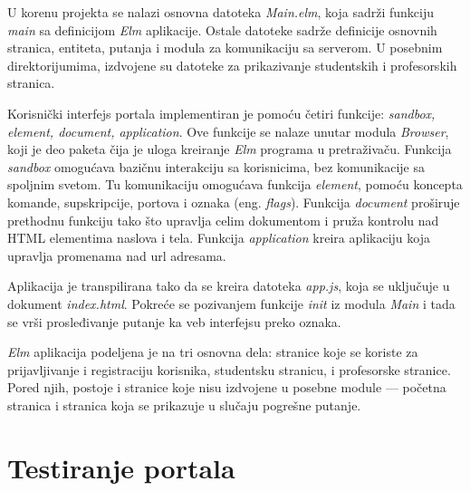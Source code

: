 \documentclass[12pt,oneside]{memoir}
\begin{document}
\par U korenu projekta se nalazi osnovna datoteka \emph{Main.elm}, koja sadrži funkciju \emph{main} sa definicijom \emph{Elm} aplikacije. Ostale datoteke sadrže definicije osnovnih stranica, entiteta, putanja i modula za komunikaciju sa serverom. U posebnim direktorijumima, izdvojene su datoteke za prikazivanje studentskih i profesorskih stranica. 
\par Korisnički interfejs portala implementiran je pomoću četiri funkcije: \emph{sandbox, element, document, application}. Ove funkcije se nalaze unutar modula \emph{Browser}, koji je deo paketa čija je uloga kreiranje \emph{Elm} programa u pretraživaču. Funkcija \emph{sandbox} omogućava bazičnu interakciju sa korisnicima, bez komunikacije sa spoljnim svetom. Tu komunikaciju omogućava funkcija \emph{element}, pomoću koncepta komande, supskripcije, portova i oznaka (eng. \emph{flags}). Funkcija \emph{document} proširuje prethodnu funkciju tako što upravlja celim dokumentom i pruža kontrolu nad HTML elementima naslova i tela. Funkcija \emph{application} kreira aplikaciju koja upravlja promenama nad url adresama. 
\par Aplikacija je transpilirana tako da se kreira datoteka \emph{app.js}, koja se uključuje u dokument \emph{index.html}. Pokreće se pozivanjem funkcije \emph{init} iz modula \emph{Main} i tada se vrši prosleđivanje putanje ka veb interfejsu preko oznaka. 
\par \emph{Elm} aplikacija podeljena je na tri osnovna dela: stranice koje se koriste za prijavljivanje i registraciju korisnika, studentsku stranicu, i profesorske stranice. Pored njih, postoje i stranice koje nisu izdvojene u posebne module --- početna stranica i stranica koja se prikazuje u slučaju pogrešne putanje.


\section{Testiranje portala}
\end{document}
